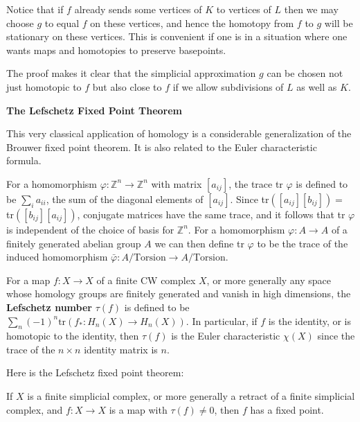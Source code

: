 Notice that if $f$ already sends some vertices of $K$ to vertices of $L$ then we may choose $g$ to equal $f$ on these vertices, and hence the homotopy from $f$ to $g$ will be stationary on these vertices. This is convenient if one is in a situation where one wants maps and homotopies to preserve basepoints.

The proof makes it clear that the simplicial approximation $g$ can be chosen not just homotopic to $f$ but also close to $f$ if we allow subdivisions of $L$ as well as $K$.

\textbf{The Lefschetz Fixed Point Theorem}

This very classical application of homology is a considerable generalization of the Brouwer fixed point theorem. It is also related to the Euler characteristic formula.

For a homomorphism $\varphi: \mathbb{Z}^n \to \mathbb{Z}^n$ with matrix $[a_{ij}]$, the trace tr $\varphi$ is defined to be $\sum_i a_{ii}$, the sum of the diagonal elements of $[a_{ij}]$. Since tr$([a_{ij}][b_{ij}]) = $ tr$([b_{ij}][a_{ij}])$, conjugate matrices have the same trace, and it follows that tr $\varphi$ is independent of the choice of basis for $\mathbb{Z}^n$. For a homomorphism $\varphi: A \to A$ of a finitely generated abelian group $A$ we can then define tr $\varphi$ to be the trace of the induced homomorphism $\bar{\varphi}: A/\text{Torsion} \to A/\text{Torsion}$.

For a map $f: X \to X$ of a finite CW complex $X$, or more generally any space whose homology groups are finitely generated and vanish in high dimensions, the \textbf{Lefschetz number} $\tau(f)$ is defined to be $\sum_n (-1)^n \text{tr}(f_*: H_n(X) \to H_n(X))$. In particular, if $f$ is the identity, or is homotopic to the identity, then $\tau(f)$ is the Euler characteristic $\chi(X)$ since the trace of the $n \times n$ identity matrix is $n$.

Here is the Lefschetz fixed point theorem:

\begin{theorem}
\label{thm:lefschetz-fixed-point}
If $X$ is a finite simplicial complex, or more generally a retract of a finite simplicial complex, and $f: X \to X$ is a map with $\tau(f) \neq 0$, then $f$ has a fixed point.
\end{theorem}

